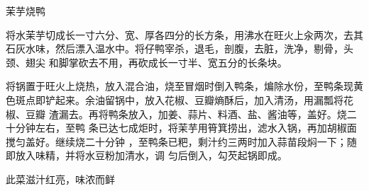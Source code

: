 \begin{recipe}{茉芋烧鸭}

\ingredients




\cooking

\step 将水茉芋切成长一寸六分、宽、厚各四分的长方条，用沸水在旺火上汆两次，去其
石灰水味，然后漂入温水中。将仔鸭宰杀，退毛，剖腹，去脏，洗净，剔骨，头颈、翅尖
和脚掌砍去不用，再砍成长一寸半、宽五分的长条块。

\step 将锅置于旺火上烧热，放入混合油，烧至冒烟时倒入鸭条，煸除水份，至鸭条现黄
色斑点即铲起来。余油留锅中，放入花椒、豆瓣熵酥后，加入清汤，用漏瓢将花椒、豆瓣
渣漏去。再将鸭条放入，加姜、蒜片、料酒、盐、酱油等，盖好。烧二十分钟左右，至鸭
条已达七成炬时，将茉芋用筲箕捞出，滤水入锅，再加胡椒面搅匀盖好。继续烧二十分钟
，至鸭条已粑，剩汁约三两时加入蒜苗段焖一下；随即放入味精，并将水豆粉加清水，调
匀后倒入，勾芡起锅即成。

\features

此菜滋汁红亮，味浓而鲜

\end{recipe}

